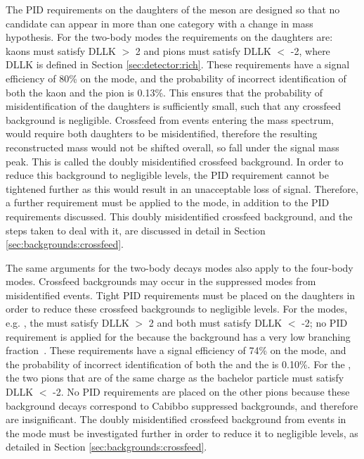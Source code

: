 The PID requirements on the daughters of the \Dz meson are designed so that no  candidate can appear in more than one category with a change in mass hypothesis. For the two-body \Dz modes the requirements on the \Dz daughters are: kaons must satisfy DLLK $>$ 2 and pions must satisfy DLLK $<$ -2, where DLLK is defined in Section \ref{sec:detector:rich}. These requirements have a signal efficiency of 80\% on the \kpi mode, and the probability of incorrect identification of both the kaon and the pion is 0.13\%. This ensures that the probability of misidentification of the \Dz daughters is sufficiently small, such that any crossfeed background is negligible. Crossfeed from \kpi events entering the \pik mass spectrum, would require both \Dz daughters to be misidentified, therefore the resulting reconstructed \Dz mass would not be shifted overall, so fall under the signal \Dz mass peak. This is called the doubly misidentified crossfeed background. In order to reduce this background to negligible levels, the PID requirement cannot be tightened further as this would result in an unacceptable loss of signal. Therefore, a further requirement must be applied to the \pik mode, in addition to the PID requirements discussed. This doubly misidentified crossfeed background, and the steps taken to deal with it, are discussed in detail in Section \ref{sec:backgrounds:crossfeed}.

The same arguments for the two-body \Dz decays modes also apply to the four-body modes. Crossfeed backgrounds may occur in the suppressed \Dz modes from misidentified \kpipipi events. Tight PID requirements must be placed on the \Dz daughters in order to reduce these crossfeed backgrounds to negligible levels. For the \decay{\Dz}{\Kmp\pipm\pimp\pipm} modes, e.g. \decay{\Dz}{\Km\pip\pim\pip}, the \Km must satisfy DLLK $>$ 2 and both \pip must satisfy DLLK $<$ -2; no PID requirement is applied for the \pim because the background \decay{\Dz}{\Kp\Km\Kp\pim} has a very low branching fraction~\cite{PDG2016}. These requirements have a signal efficiency of 74\% on the \kpipipi mode, and the probability of incorrect identification of both the \Km and the \pip is 0.10\%. For the \decay{\Dz}{\pip\pim\pip\pim}, the two pions that are of the same charge as the bachelor particle must satisfy DLLK $<$ -2. No PID requirements are placed on the other pions because these background decays correspond to Cabibbo suppressed backgrounds, and therefore are insignificant. The doubly misidentified crossfeed background from \kpipipi events in the \pikpipi mode must be investigated further in order to reduce it to negligible levels, as detailed in Section \ref{sec:backgrounds:crossfeed}.

